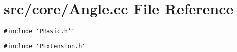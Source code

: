 \section{src/core/Angle.cc File Reference}
\label{Angle_8cc}


{\tt \#include \char`\"{}PBasic.h\char`\"{}}\par
{\tt \#include \char`\"{}PExtension.h\char`\"{}}\par
